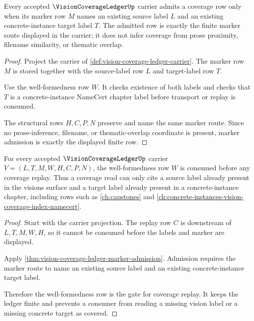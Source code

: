 \begin{theorem}
\label{thm:vision-coverage-ledger-marker-admission}
Every accepted $\VisionCoverageLedgerUp$ carrier admits a coverage row only when its marker row $M$ names an existing source label $L$ and an existing concrete-instance target label $T$. The admitted row is exactly the finite marker route displayed in the carrier; it does not infer coverage from prose proximity, filename similarity, or thematic overlap.
\end{theorem}
\begin{proof}
Project the carrier of \autoref{def:vision-coverage-ledger-carrier}. The marker row $M$ is stored together with the source-label row $L$ and target-label row $T$.

Use the well-formedness row $W$. It checks existence of both labels and checks that $T$ is a concrete-instance NameCert chapter label before transport or replay is consumed.

The structural rows $H,C,P,N$ preserve and name the same marker route. Since no prose-inference, filename, or thematic-overlap coordinate is present, marker admission is exactly the displayed finite row.
\end{proof}

\begin{theorem}
\label{thm:vision-coverage-ledger-label-well-formedness}
For every accepted $\VisionCoverageLedgerUp$ carrier $V=(L,T,M,W,H,C,P,N)$, the well-formedness row $W$ is consumed before any coverage replay. Thus a coverage read can only cite a source label already present in the visions surface and a target label already present in a concrete-instance chapter, including rows such as \autoref{ch:capstones} and \autoref{ch:concrete-instances-vision-coverage-index-namecert}.
\end{theorem}
\begin{proof}
Start with the carrier projection. The replay row $C$ is downstream of $L,T,M,W,H$, so it cannot be consumed before the labels and marker are displayed.

Apply \autoref{thm:vision-coverage-ledger-marker-admission}. Admission requires the marker route to name an existing source label and an existing concrete-instance target label.

Therefore the well-formedness row is the gate for coverage replay. It keeps the ledger finite and prevents a consumer from reading a missing vision label or a missing concrete target as covered.
\end{proof}

